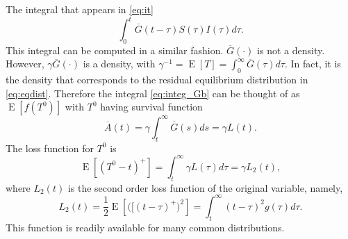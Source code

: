 \documentclass[USenglish,10pt]{article}
\newcommand{\Ab}{\overline{A}\xspace}
\newcommand{\Gb}{\overline{G}\xspace}
\DeclareMathOperator{\Exp}{E}       %
\newcommand{\E}[1]{\Exp\left[{#1}\right]}       %
\begin{document}
The integral that appears in \eqref{eq:it}
\begin{equation}
	\int_0^t \Gb(t-\tau ) S(\tau)I(\tau)d\tau.
	\label{eq:integ_Gb}
\end{equation}
This integral can be computed in a similar fashion. $\Gb(\cdot)$  is not a density.
However, $\gamma\Gb(\cdot)$ is a density, with $\gamma^{-1}=\E{T}=\int_0^\infty\Gb(\tau)d\tau$.
In fact,  it is the density that corresponds to the residual equilibrium distribution in \eqref{eq:eqdist}. Therefore the integral \eqref{eq:integ_Gb} can be thought of as $\E{f(T^0)}$ with $T^0$ having survival function
\[ \Ab(t) = \gamma \int_t^\infty \Gb(s)ds = \gamma L(t).\]
The loss function for $T^0$ is
\[ \E{(T^0-t)^+} = \int_t^\infty \gamma L(\tau)d\tau  = \gamma L_2(t),\]
where $L_2(t)$ is the second order loss function of the original variable, namely,
\[ L_2(t) = \frac{1}{2} \E{\big([(t-\tau)^+\big)^2} =\int_t^\infty (t-\tau)^2 g(\tau)d\tau. \]
This function is readily available for many common distributions.












\end{document}
